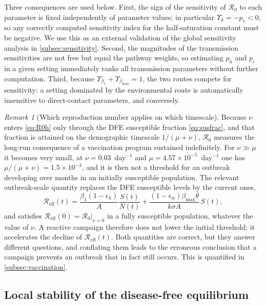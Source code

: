 \documentclass[11pt]{article}
\theoremstyle{plain}
\theoremstyle{definition}
\theoremstyle{remark}
\newtheorem{remark}[theorem]{Remark}
\newcommand{\Rz}{\mathcal{R}_0}
\newcommand{\Reff}{\mathcal{R}_{\mathrm{eff}}}
\begin{document}
Three consequences are used below. First, the sign of the sensitivity of $\Rz$ to each parameter is fixed independently of parameter values; in particular $\Upsilon_k=-p_e<0$, so any correctly computed sensitivity index for the half-saturation constant must be negative. We use this as an external validation of the global sensitivity analysis in \cref{subsec:sensitivity}. Second, the magnitudes of the transmission sensitivities are not free but equal the pathway weights, so estimating $p_h$ and $p_e$ in a given setting immediately ranks all transmission parameters without further computation. Third, because $\Upsilon_{\beta_1}+\Upsilon_{\beta_{\max}}=1$, the two routes compete for sensitivity: a setting dominated by the environmental route is automatically insensitive to direct-contact parameters, and conversely.

\begin{remark}[Which reproduction number applies on which timescale]\label{rem:timescale}
Because $\nu$ enters \eqref{eq:R0h} only through the DFE susceptible fraction \eqref{eq:susfrac}, and that fraction is attained on the demographic timescale $1/(\mu+\nu)$, $\Rz$ measures the long-run consequence of a vaccination program sustained indefinitely. For $\nu\gg\mu$ it becomes very small, at $\nu=0.03$~day$^{-1}$ and $\mu=4.57\times10^{-5}$~day$^{-1}$ one has $\mu/(\mu+\nu)=1.5\times10^{-3}$, and it is then not a threshold for an outbreak developing over months in an initially susceptible population. The relevant outbreak-scale quantity replaces the DFE susceptible levels by the current ones,
\begin{equation}\label{eq:Reff}
\Reff(t)=\frac{\beta_1(1-\epsilon_h)}{A}\frac{S(t)}{N(t)}+\frac{(1-\epsilon_w)\beta_{\max}\theta}{k\sigma A}\,S(t),
\end{equation}
and satisfies $\Reff(0)=\Rz\big|_{\nu=0}$ in a fully susceptible population, whatever the value of $\nu$. A reactive campaign therefore does not lower the initial threshold; it accelerates the decline of $\Reff(t)$. Both quantities are correct, but they answer different questions, and conflating them leads to the erroneous conclusion that a campaign prevents an outbreak that in fact still occurs. This is quantified in \cref{subsec:vaccination}.
\end{remark}

\subsection{Local stability of the disease-free equilibrium}\label{subsec:local}
\end{document}
